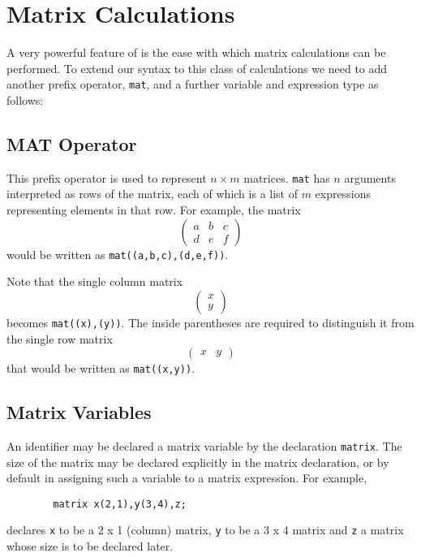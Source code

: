 \chapter{Matrix Calculations} 
A very powerful feature of {\REDUCE} is the ease with which matrix
calculations can be performed. To extend our syntax to this class of
calculations we need to add another prefix operator, \texttt{mat},
and a further variable and expression type as follows:

\section{MAT Operator}
\hypertarget{operator:MAT}{}
This prefix operator is used to represent $n\times m$ matrices. \texttt{mat}
has $n$ arguments interpreted as rows of the matrix, each of
which is a list of $m$ expressions representing elements in that row.
For example, the matrix
\[ \left( \begin{array}{lcr} a & b & c \\ d & e & f \end{array} \right) \]
would be written as \texttt{mat((a,b,c),(d,e,f))}.

Note that the single column matrix
\[ \left( \begin{array}{c} x \\ y \end{array} \right) \]
becomes \texttt{mat((x),(y))}.  The inside parentheses are required to
distinguish it from the single row matrix
\[ \left( \begin{array}{lr} x & y \end{array} \right) \]
that would be written as \texttt{mat((x,y))}.

\section{Matrix Variables}
\label{sec:core-matrix-variables}
\hypertarget{command:MATRIX}{}

An identifier may be declared a matrix variable by the declaration 
\texttt{matrix}.
The size of the matrix may be declared explicitly in the matrix
declaration, or by default in assigning such a variable to a matrix
expression. For example,
\begin{verbatim}
        matrix x(2,1),y(3,4),z;
\end{verbatim}
declares \texttt{x} to be a 2 x 1 (column) matrix, \texttt{y} to be a 3 x 4
matrix and \texttt{z} a matrix whose size is to be declared later.

